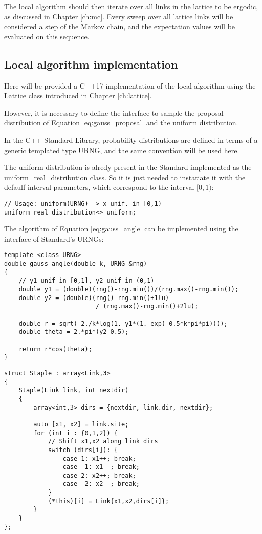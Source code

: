 The local algorithm should then iterate over all links in the lattice to be ergodic, as discussed in Chapter \ref{ch:mc}.
Every sweep over all lattice links will be considered a step of the Markov chain,
and the expectation values will be evaluated on this sequence.

\subsection*{Local algorithm implementation}
Here will be provided a C++17 implementation of the local algorithm using the {\ttfamily Lattice class} introduced in Chapter \ref{ch:lattice}.

However, it is necessary to define the interface to sample the proposal distribution of Equation \eqref{eq:gauss_proposal} and the uniform distribution.

In the C++ Standard Library, probability distributions are defined in terms of a generic templated type {\ttfamily URNG},
and the same convention will be used here.

The uniform distribution is alredy present in the Standard implemented as the {\ttfamily uniform\_real\_distribution} class.
So it is just needed to instatiate it with the defaulf interval parameters, which correspond to the interval $[0,1)$:
\begin{lstlisting}[caption={Uniform distribution sampling function}]
// Usage: uniform(URNG) -> x unif. in [0,1)
uniform_real_distribution<> uniform;
\end{lstlisting}

The algorithm of Equation \eqref{eq:gauss_angle} can be implemented using the interface of Standard's URNGs:
\begin{lstlisting}[caption={Gaussian angle distribution sampling function}]
template <class URNG>
double gauss_angle(double k, URNG &rng)
{
	// y1 unif in [0,1], y2 unif in (0,1)
    double y1 = (double)(rng()-rng.min())/(rng.max()-rng.min());
    double y2 = (double)(rng()-rng.min()+1lu)
                         / (rng.max()-rng.min()+2lu);

    double r = sqrt(-2./k*log(1.-y1*(1.-exp(-0.5*k*pi*pi))));
    double theta = 2.*pi*(y2-0.5);

    return r*cos(theta);
}
\end{lstlisting}


\begin{lstlisting}[caption={Staple type}]
struct Staple : array<Link,3>
{
    Staple(Link link, int nextdir)
    {
        array<int,3> dirs = {nextdir,-link.dir,-nextdir};

        auto [x1, x2] = link.site;
        for (int i : {0,1,2}) {
            // Shift x1,x2 along link dirs
            switch (dirs[i]): {
                case 1: x1++; break;
                case -1: x1--; break;
                case 2: x2++; break;
                case -2: x2--; break;
            }
            (*this)[i] = Link{x1,x2,dirs[i]};
        }
    }
};
\end{lstlisting}

